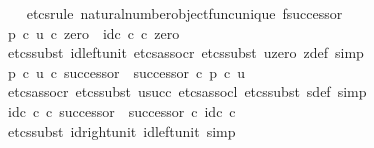 \begin{isabellebody}
\ \ \isamarkupfalse%
\ {\isacharparenleft}{\kern0pt}etcs{\isacharunderscore}{\kern0pt}rule\ natural{\isacharunderscore}{\kern0pt}number{\isacharunderscore}{\kern0pt}object{\isacharunderscore}{\kern0pt}func{\isacharunderscore}{\kern0pt}unique{\isacharbrackleft}{\kern0pt}\ f{\isacharequal}{\kern0pt}successor{\isacharbrackright}{\kern0pt}{\isacharparenright}{\kern0pt}\isanewline
\ \ \ \ \isamarkupfalse%
\ {\isachardoublequoteopen}{\isacharparenleft}{\kern0pt}p{\isacharprime}{\kern0pt}\ {\isasymcirc}\isactrlsub c\ u{\isacharparenright}{\kern0pt}\ {\isasymcirc}\isactrlsub c\ zero\ {\isacharequal}{\kern0pt}\ id\isactrlsub c\ {\isasymnat}\isactrlsub c\ {\isasymcirc}\isactrlsub c\ zero{\isachardoublequoteclose}\isanewline
\ \ \ \ \ \ \isamarkupfalse%
\ {\isacharparenleft}{\kern0pt}etcs{\isacharunderscore}{\kern0pt}subst\ id{\isacharunderscore}{\kern0pt}left{\isacharunderscore}{\kern0pt}unit{}{\isacharcomma}{\kern0pt}\ etcs{\isacharunderscore}{\kern0pt}assocr{\isacharcomma}{\kern0pt}\ etcs{\isacharunderscore}{\kern0pt}subst\ u{\isacharunderscore}{\kern0pt}zero\ z{\isacharprime}{\kern0pt}{\isacharunderscore}{\kern0pt}def{\isacharcomma}{\kern0pt}\ simp{\isacharparenright}{\kern0pt}\isanewline
\ \ \ \ \isamarkupfalse%
\ {\isachardoublequoteopen}{\isacharparenleft}{\kern0pt}p{\isacharprime}{\kern0pt}\ {\isasymcirc}\isactrlsub c\ u{\isacharparenright}{\kern0pt}\ {\isasymcirc}\isactrlsub c\ successor\ {\isacharequal}{\kern0pt}\ successor\ {\isasymcirc}\isactrlsub c\ p{\isacharprime}{\kern0pt}\ {\isasymcirc}\isactrlsub c\ u{\isachardoublequoteclose}\isanewline
\ \ \ \ \ \ \isamarkupfalse%
\ {\isacharparenleft}{\kern0pt}etcs{\isacharunderscore}{\kern0pt}assocr{\isacharcomma}{\kern0pt}\ etcs{\isacharunderscore}{\kern0pt}subst\ u{\isacharunderscore}{\kern0pt}succ{\isacharcomma}{\kern0pt}\ etcs{\isacharunderscore}{\kern0pt}assocl{\isacharcomma}{\kern0pt}\ etcs{\isacharunderscore}{\kern0pt}subst\ s{\isacharprime}{\kern0pt}{\isacharunderscore}{\kern0pt}def{\isacharcomma}{\kern0pt}\ simp{\isacharparenright}{\kern0pt}\isanewline
\ \ \ \ \isamarkupfalse%
\ {\isachardoublequoteopen}id\isactrlsub c\ {\isasymnat}\isactrlsub c\ {\isasymcirc}\isactrlsub c\ successor\ {\isacharequal}{\kern0pt}\ successor\ {\isasymcirc}\isactrlsub c\ id\isactrlsub c\ {\isasymnat}\isactrlsub c{\isachardoublequoteclose}\isanewline
\ \ \ \ \ \ \isamarkupfalse%
\ {\isacharparenleft}{\kern0pt}etcs{\isacharunderscore}{\kern0pt}subst\ id{\isacharunderscore}{\kern0pt}right{\isacharunderscore}{\kern0pt}unit{}\ id{\isacharunderscore}{\kern0pt}left{\isacharunderscore}{\kern0pt}unit{}{\isacharcomma}{\kern0pt}\ simp{\isacharparenright}{\kern0pt}\isanewline

\end{isabellebody}
